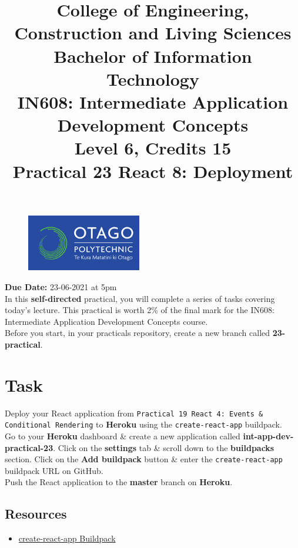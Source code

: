\documentclass{article}
\author{}
\begin{document}
\begin{figure}
	\centering
	\includegraphics[width=50mm]{img/logo.png}
\end{figure}

\title{College of Engineering, Construction and Living Sciences\\Bachelor of Information Technology\\IN608: Intermediate Application Development Concepts\\Level 6, Credits 15\\\textbf{Practical 23 React 8: Deployment}} 
\date{}
\maketitle 

\textbf{Due Date:} 23-06-2021 at 5pm \\

In this \textbf{self-directed} practical, you will complete a series of tasks covering today's lecture. This practical is worth 2\% of the final mark for the IN608: Intermediate Application Development Concepts course. \\

Before you start, in your practicals repository, create a new branch called \textbf{23-practical}. 

\section*{Task} 
Deploy your React application from \texttt{Practical 19 React 4: Events \& Conditional Rendering} to \textbf{Heroku} using the \texttt{create-react-app} buildpack. \\

Go to your \textbf{Heroku} dashboard \& create a new application called \textbf{int-app-dev-practical-23}. Click on the \textbf{settings} tab \& scroll down to the \textbf{buildpacks} section. Click on the \textbf{Add buildpack} button \& enter the \texttt{create-react-app} buildpack URL on GitHub. \\

Push the React application to the \textbf{master} branch on \textbf{Heroku}. 

\subsection*{Resources} 
\begin{itemize}
  \item \href{https://github.com/mars/create-react-app-buildpack}{create-react-app Buildpack}
\end{itemize}
 
\end{document}
